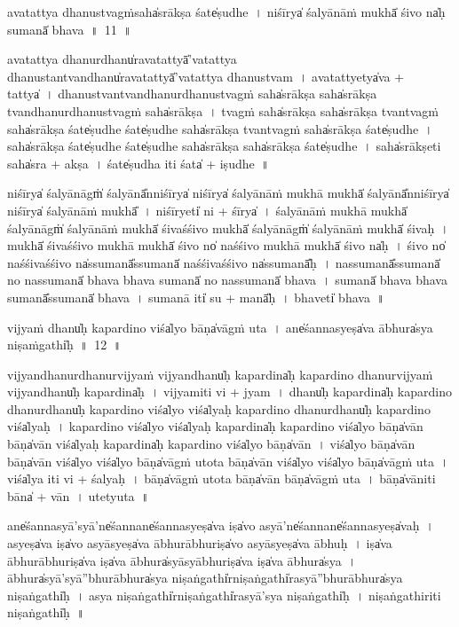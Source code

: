 \documentclass[parskip, DIV=14]{scrartcl}
\begin{document}
{\vspace{0.5cm}
a॒va॒tattya॒ dhanu॒stvagṁsaha̍srākṣa॒ śate̍ṣudhe~।
ni॒śīrya̍ śa॒lyānā॒ṁ mukhā̍ śi॒vo na̍ḥ su॒manā̍ bhava~॥~11~॥

a॒va॒tattya॒ dhanu॒rdhanu̍rava॒tattyā̍'va॒tattya॒ dhanu॒stantvandhanu̍rava॒tattyā̍'va॒tattya॒ dhanu॒stvam~।
a॒va॒tattyetya̍va + tattya̍~।
dhanu॒stvantvandhanu॒rdhanu॒stvagṁ saha̍srākṣa॒ saha̍srākṣa॒ tvandhanu॒rdhanu॒stvagṁ saha̍srākṣa~।
tvagṁ saha̍srākṣa॒ saha̍srākṣa॒ tvantvagṁ saha̍srākṣa॒ śate̍ṣudhe॒ śate̍ṣudhe॒ saha̍srākṣa॒ tvantvagṁ saha̍srākṣa॒ śate̍ṣudhe~।
saha̍srākṣa॒ śate̍ṣudhe॒ śate̍ṣudhe॒ saha̍srākṣa॒ saha̍srākṣa॒ śate̍ṣudhe~।
saha̍srā॒kṣeti॒ saha̍sra + a॒kṣa॒~।
śate̍ṣudha॒ iti॒ śata̍ + i॒ṣu॒dhe॒~॥ 

ni॒śīrya̍ śa॒lyānāgṁ̍ śa॒lyānā̎nni॒śīrya̍ ni॒śīrya̍ śa॒lyānā॒ṁ mukhā॒ mukhā̍  śa॒lyānā̎nni॒śīrya̍ ni॒śīrya̍ śa॒lyānā॒ṁ mukhā̎~।
ni॒śīryeti̍ ni + śīrya̍~।
śa॒lyānā॒ṁ mukhā॒ mukhā̍  śa॒lyānāgṁ̍ śa॒lyānā॒ṁ mukhā̍  śi॒vaśśi॒vo mukhā̍  śa॒lyānāgṁ̍ śa॒lyānā॒ṁ mukhā̍  śi॒vaḥ~।
mukhā̍ śi॒vaśśi॒vo mukhā॒ mukhā̍ śi॒vo no̍ naśśi॒vo mukhā॒ mukhā̍ śi॒vo na̍ḥ~।
śi॒vo no̍ naśśi॒vaśśi॒vo na̍ssu॒manā̎ssu॒manā̍ naśśi॒vaśśi॒vo na̍ssu॒manā̎ḥ~।
na॒ssu॒manā̎ssu॒manā̍ no nassu॒manā̍ bhava bhava su॒manā̍ no nassu॒manā̍ bhava~।
su॒manā̍ bhava bhava su॒manā̎ssu॒manā̍ bhava~।
su॒manā॒ iti̍ su + manā̎ḥ~।
bha॒veti̍ bhava~॥ 

\vspace{0.5cm}
vijya॒ṁ dhanu̍ḥ kapa॒rdino॒ viśa̍lyo॒ bāṇa̍vāgṁ u॒ta~।
ane̍śanna॒syeṣa̍va ā॒bhura̍sya niṣa॒ṁgathi̍ḥ~॥~12~॥

vijya॒ndhanu॒rdhanu॒rvijya॒ṁ vijya॒ndhanu̍ḥ kapa॒rdina̍ḥ kapa॒rdino॒ dhanu॒rvijya॒ṁ vijya॒ndhanu̍ḥ kapa॒rdina̍ḥ~।
vijya॒miti॒ vi + jya॒m॒~।
dhanu̍ḥ kapa॒rdina̍ḥ kapa॒rdino॒ dhanu॒rdhanu̍ḥ kapa॒rdino॒ viśa̍lyo॒ viśa̍lyaḥ kapa॒rdino॒ dhanu॒rdhanu̍ḥ kapa॒rdino॒ viśa̍lyaḥ~।
ka॒pa॒rdino॒ viśa̍lyo॒ viśa̍lyaḥ kapa॒rdina̍ḥ kapa॒rdino॒ viśa̍lyo॒ bāṇa̍vā॒n bāṇa̍vā॒n viśa̍lyaḥ kapa॒rdina̍ḥ kapa॒rdino॒ viśa̍lyo॒ bāṇa̍vān~।
viśa̍lyo॒ bāṇa̍vā॒n bāṇa̍vā॒n viśa̍lyo॒ viśa̍lyo॒ bāṇa̍vāgṁ u॒tota bāṇa̍vā॒n viśa̍lyo॒ viśa̍lyo॒ bāṇa̍vāgṁ u॒ta~।
viśa̍lya॒ iti॒ vi + śa॒lya॒ḥ~।
bāṇa̍vāgṁ u॒tota bāṇa̍vā॒n bāṇa̍vāgṁ u॒ta~।
bāṇa̍vā॒niti॒ bāna̍ + vā॒n॒~।
u॒tetyu॒ta~॥ 

ane̍śannasyā॒'syā'ne̍śa॒nnane̍śanna॒syeṣa̍va॒ iṣa̍vo a॒syā'ne̍śa॒nnane̍śanna॒syeṣa̍vaḥ~। %
a॒syeṣa̍va॒ iṣa̍vo asyā॒syeṣa̍va ā॒bhurā॒bhuriṣa̍vo asyā॒syeṣa̍va ā॒bhuḥ~।
iṣa̍va ā॒bhurā॒bhuriṣa̍va॒ iṣa̍va ā॒bhura̍syāsyā॒bhuriṣa̍va॒ iṣa̍va ā॒bhura̍sya~।
ā॒bhura̍syā'syā॒''bhurā॒bhura̍sya niṣa॒ṅgathi̍rniṣa॒ṅgathi̍rasyā॒''bhurā॒bhura̍sya niṣa॒ṅgathi̍ḥ~।
a॒sya॒ ni॒ṣa॒ṅgathi̍rniṣa॒ṅgathi̍rasyā'sya niṣa॒ṅgathi̍ḥ~।
ni॒ṣa॒ṅgathi॒riti niṣa॒ṅgathi̍ḥ~॥  %
 

}
\end{document}
